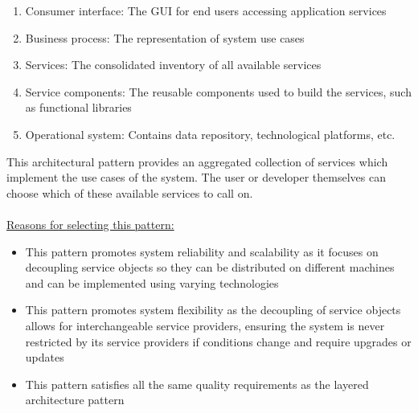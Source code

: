 \documentclass[a4paper,10pt]{article}
\begin{document}
\begin{itemize}
	\begin{enumerate}
		\item Consumer interface: The GUI for end users accessing application services 
		\item Business process: The representation of system use cases 
		\item Services: The consolidated inventory of all available services
		\item Service components: The reusable components used to build the services, such as functional libraries
		\item Operational system: Contains data repository, technological platforms, etc. \\
	\end{enumerate}
	This architectural pattern provides an aggregated collection of services which implement the use cases of the system. The user or developer themselves can choose which of these available services to call on.\\\\
	\underline{Reasons for selecting this pattern:}
	\begin{itemize}
		\item This pattern promotes system reliability and scalability as it focuses on decoupling service objects so they can be distributed on different machines and can be implemented using varying technologies
		\item This pattern promotes system flexibility as the decoupling of service objects allows for interchangeable service providers, ensuring the system is never restricted by its service providers if conditions change and require upgrades or updates
		\item This pattern satisfies all the same quality requirements as the layered architecture pattern
	\end{itemize}
\end{itemize}



\newpage
\clearpage
\end{document}
